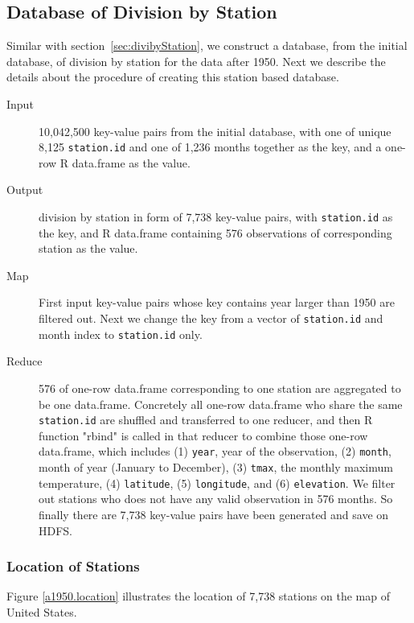 \subsection{Database of Division by Station}

Similar with section~\ref{sec:divibyStation}, we construct a database, from the
initial database, of division by station for the data after 1950. Next we 
describe the details about the procedure of creating this station based database.

\begin{description}
  \item[Input] 10,042,500 key-value pairs from the initial database, with one of
  unique 8,125 \texttt{station.id} and one of 1,236 months together as the key, 
  and a one-row R data.frame as the value. 
  \item[Output] division by station in form of 7,738 key-value pairs, with 
  \texttt{station.id} as the key, and R data.frame containing 576 observations 
  of corresponding station as the value.
  \item[Map]First input key-value pairs whose key contains year larger than 1950
  are filtered out. Next we change the key from a vector of \texttt{station.id} 
  and month index to \texttt{station.id} only. 
  \item[Reduce] 576 of one-row data.frame corresponding to one station are 
  aggregated to be one data.frame. Concretely all one-row data.frame who share
  the same \texttt{station.id} are shuffled and transferred to one reducer, and 
  then R function "rbind" is called in that reducer to combine those one-row 
  data.frame, which includes (1) \texttt{year}, year of the observation, 
  (2) \texttt{month}, month of year (January to December), (3) \texttt{tmax}, 
  the monthly maximum temperature, (4) \texttt{latitude}, (5) \texttt{longitude}, 
  and (6) \texttt{elevation}. We filter out stations who does not have any valid
  observation in 576 months. So finally there are 7,738 key-value pairs have been
  generated and save on HDFS. 
\end{description}

\subsubsection{Location of Stations}

Figure \href{../plots/a1950stations.pdf}{\ref*{a1950.location}} illustrates the 
location of 7,738 stations on the map of United States.

